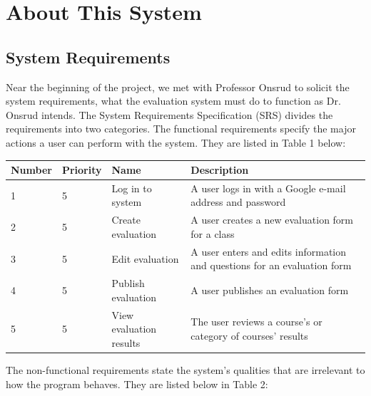 \documentclass{article}
\begin{document}
\newpage

\section{About This System}

\subsection{System Requirements}

Near the beginning of the project, we met with Professor Onsrud to solicit the system requirements, what the evaluation system must do to function as Dr. Onsrud intends. The System Requirements Specification (SRS) divides the requirements into two categories. The functional requirements specify the major actions a user can perform with the system. They are listed in Table 1 below:

\begin{center}

\begin{tabular}{|p{1.5cm}|p{1.5cm}|p{3.5cm}|p{6cm}|} 
\hline
\textbf{Number} & \textbf{Priority} & \textbf{Name} & \textbf{Description} \\
\hline
1 & 5 & Log in to system & A user logs in with a Google e-mail address and password \\ 
\hline
2 & 5 & Create evaluation & A user creates a new evaluation form for a class \\ 
\hline
3 & 5 & Edit evaluation & A user enters and edits information and questions for an evaluation form \\  
\hline
4 & 5 & Publish evaluation & A user publishes an evaluation form \\
\hline
5 & 5 & View evaluation results & The user reviews a course's or category of courses' results \\ 
\hline
\end{tabular}
\end{center}

The non-functional requirements state the system's qualities that are irrelevant to how the program behaves. They are listed below in Table 2:
\end{document}
